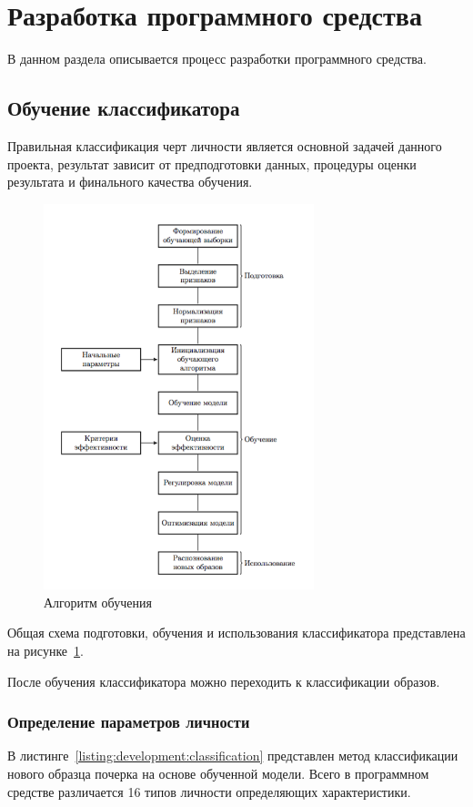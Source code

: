 \section{Разработка программного средства}

В данном раздела описывается процесс разработки программного \mbox{средства.}
\subsection{Обучение классификатора}
Правильная классификация черт личности является основной задачей данного проекта, результат зависит от предподготовки данных, процедуры оценки результата и финального качества обучения.

\begin{figure}[h]
    \centering
    \includegraphics[width=0.7\textwidth]{figures/SVM_flow.png}
    \caption{Алгоритм обучения}
    \label{fig:develoipment:svm_flow}
\end{figure}

Общая схема подготовки, обучения и использования классификатора представлена на рисунке~\ref{fig:develoipment:svm_flow}.

После обучения классификатора можно переходить к классификации образов. 

\subsubsection{Определение параметров личности}
В листинге~\ref{listing:development:classification} представлен метод классификации нового образца почерка на основе обученной модели. Всего в программном средстве различается 16 типов личности определяющих характеристики.

